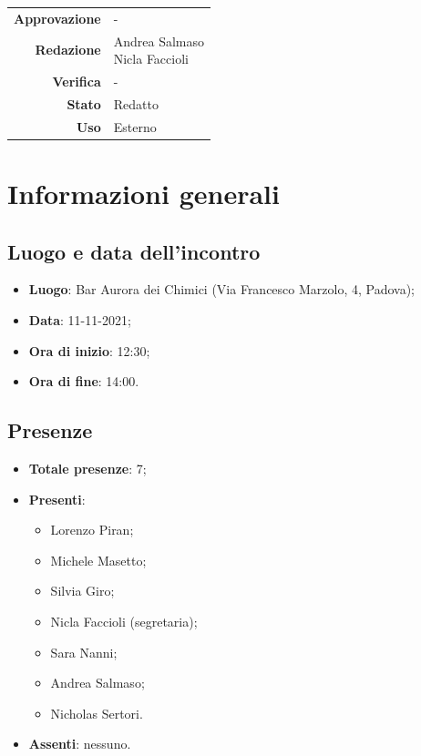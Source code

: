 \documentclass[11pt]{article}
\begin{document}
\begin{titlepage}
\begin{center}
			\large
			
			
			\vfill
			
			\begin{tabular}{r|l}
				\textbf{Approvazione} &  -\\
				\textbf{Redazione} &  \parbox[t]{3.5cm}{Andrea Salmaso \\Nicla Faccioli}\\
				\textbf{Verifica} &  -\\
				\textbf{Stato} & Redatto \\
				\textbf{Uso} & Esterno
			\end{tabular}
			\vfill
			
		\end{center}
	\end{titlepage}

	\newpage
	
	\section{Informazioni generali}
	\subsection{Luogo e data dell'incontro}
	\begin{itemize}
		\item \textbf{Luogo}: Bar Aurora dei Chimici (Via Francesco Marzolo, 4, Padova);
		\item \textbf{Data}: 11-11-2021;
		\item \textbf{Ora di inizio}: 12:30;
		\item \textbf{Ora di fine}: 14:00.
	\end{itemize}
	
	\subsection{Presenze}
	\begin{itemize}
		\item \textbf{Totale presenze}: 7;
		\item \textbf{Presenti}:
		\begin{itemize}
			\item Lorenzo Piran; 
			\item Michele Masetto;
			\item Silvia Giro;
			\item Nicla Faccioli (segretaria);
			\item Sara Nanni;
			\item Andrea Salmaso;
			\item Nicholas Sertori.
		\end{itemize}
		\item \textbf{Assenti}: nessuno.
	\end{itemize}
\end{document}
